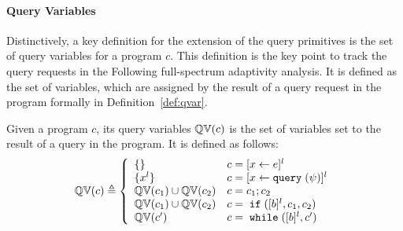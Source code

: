 \paragraph*{Query Variables}
Distinctively, a key definition for the extension of the query primitives 
is the set of query variables for a program $c$.
This definition is the key point to track the query requests in the Following full-spectrum adaptivity analysis.
It is defined as the set of variables,
which are assigned by the result of a query request in the program formally in Definition~\ref{def:qvar}.
%
\begin{defn} 
  \label{def:qvar}
Given a program $c$, its query variables 
$\mathbb{QV}(c)$ is the set of variables set to the result of a query in the program.
It is defined as follows:
{
$$
  \qvar(c) \triangleq
  \left\{
  \begin{array}{ll}
      \{\}                  
      & {c} = [{\assign x \expr}]^{l} 
      \\
      \{{x}^l\}                  
      & {c} = [{\assign x \query(\qexpr)}]^{l} 
      \\
      \qvar(c_1) \cup \qvar(c_2)  
      & {c} = {c_1};{c_2}
      \\
      \qvar(c_1) \cup \qvar(c_2) 
      & {c} =\eif([\bexpr]^{l}, c_1, c_2) 
      \\
      \qvar(c')
      & {c}   = \ewhile ([\bexpr]^{l}, {c}')
\end{array}
\right.
$$
}
\end{defn}
